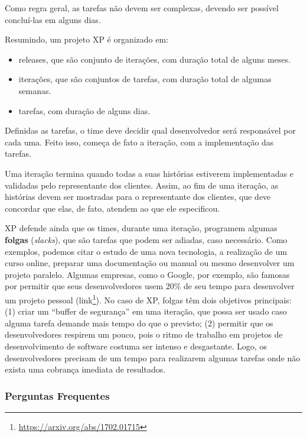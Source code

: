 \documentclass[
  11pt,
  twoside]{book}
\DeclareRobustCommand{\href}[2]{#2\footnote{\url{#1}}}
\begin{document}
Como regra geral, as tarefas não devem ser complexas, devendo ser
possível concluí-las em alguns dias.

Resumindo, um projeto XP é organizado em:

\begin{itemize}
\item
  releases, que são conjunto de iterações, com duração total de alguns
  meses.
\item
  iterações, que são conjuntos de tarefas, com duração total de algumas
  semanas.
\item
  tarefas, com duração de alguns dias.
\end{itemize}

Definidas as tarefas, o time deve decidir qual desenvolvedor será
responsável por cada uma. Feito isso, começa de fato a iteração, com a
implementação das tarefas.

Uma iteração termina quando todas a suas histórias estiverem
implementadas e validadas pelo representante dos clientes. Assim, ao fim
de uma iteração, as histórias devem ser mostradas para o representante
dos clientes, que deve concordar que elas, de fato, atendem ao que ele
especificou.

 XP defende ainda que os times, durante uma iteração,
programem algumas \textbf{folgas} (\emph{slacks}), que são tarefas que
podem ser adiadas, caso necessário. Como exemplos, podemos citar o
estudo de uma nova tecnologia, a realização de um curso online, preparar
uma documentação ou manual ou mesmo desenvolver um projeto paralelo.
Algumas empresas, como o Google, por exemplo, são famosas por permitir
que seus desenvolvedores usem 20\% de seu tempo para desenvolver um
projeto pessoal (\href{https://arxiv.org/abs/1702.01715}{link}). No caso
de XP, folgas têm dois objetivos principais: (1) criar um ``buffer de
segurança'' em uma iteração, que possa ser usado caso alguma tarefa
demande mais tempo do que o previsto; (2) permitir que os
desenvolvedores respirem um pouco, pois o ritmo de trabalho em projetos
de desenvolvimento de software costuma ser intenso e desgastante. Logo,
os desenvolvedores precisam de um tempo para realizarem algumas tarefas
onde não exista uma cobrança imediata de resultados.

\hypertarget{perguntas-frequentes}{%
\subsubsection*{Perguntas Frequentes}\label{perguntas-frequentes}}
\end{document}

